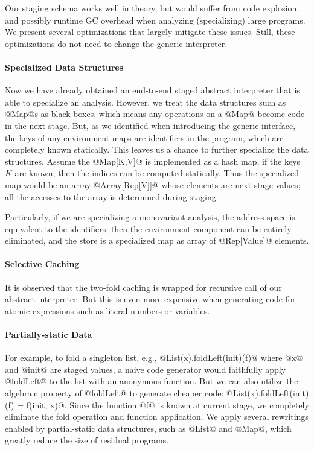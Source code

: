 Our staging schema works well in theory, but would suffer from code explosion,
and possibly runtime GC overhead when analyzing (specializing) large programs.
We present several optimizations that largely mitigate these issues. Still,
these optimizations do not need to change the generic interpreter.

\paragraph{Specialized Data Structures}

Now we have already obtained an end-to-end staged abstract interpreter that is
able to specialize an analysis. However, we treat the data structures such as
@Map@s as black-boxes, which means any operations on a @Map@ become code in the
next stage. But, as we identified when introducing the generic interface, the
keys of any environment maps are identifiers in the program, which are
completely known statically. This leaves us a chance to further specialize the
data structures. Assume the @Map[K,V]@ is implemented as a hash map, if the keys
$K$ are known, then the indices can be computed statically. Thus the specialized
map would be an array @Array[Rep[V]]@ whose elements are next-stage values; all
the accesses to the array is determined during staging.

Particularly, if we are specializing a monovariant analysis, the address space
is equivalent to the identifiers, then the environment component can be entirely
eliminated, and the store is a specialized map as array of @Rep[Value]@
elements.

\paragraph{Selective Caching} It is observed that the two-fold caching is
wrapped for recursive call of our abstract interpreter. But this is even more
expensive when generating code for atomic expressions such as literal numbers or
variables. 

\paragraph{Partially-static Data}

For example, to fold a singleton list, e.g., @List(x).foldLeft(init)(f)@ where
@x@ and @init@ are staged values, a naive code generator would faithfully
apply @foldLeft@ to the list with an anonymous function. But we can also utilize
the algebraic property of @foldLeft@ to generate cheaper code:
@List(x).foldLeft(init)(f) = f(init, x)@.
Since the function @f@ is known at current stage, we completely eliminate the
fold operation and function application. We apply several rewritings enabled by
partial-static data structures, such as @List@ and @Map@, which greatly reduce
the size of residual programs.

